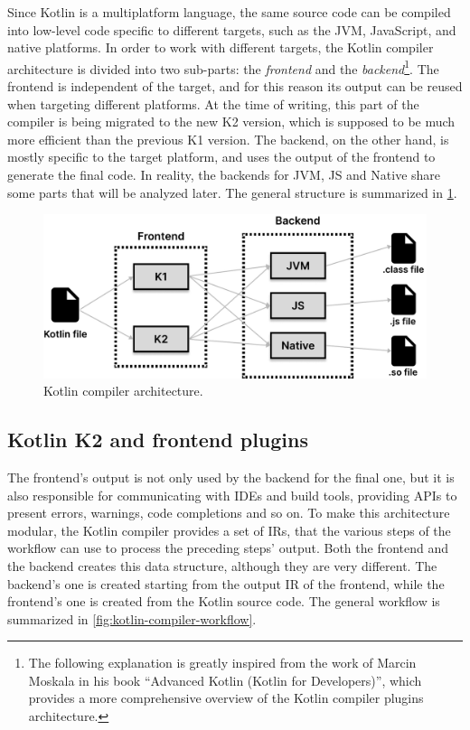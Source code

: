 \documentclass[12pt,a4paper,openright,twoside]{book}
\begin{document}
Since Kotlin is a multiplatform language, the same source code can be compiled
into low-level code specific to different targets, such as the JVM, JavaScript,
and native platforms. In order to work with different targets, the Kotlin
compiler architecture is divided into two sub-parts: the \emph{frontend} and the
\emph{backend}\footnote{The following explanation is greatly inspired from the
work of Marcin Moskala in his book ``Advanced Kotlin (Kotlin for Developers)'',
which provides a more comprehensive overview of the Kotlin compiler plugins
architecture.}.
%
The frontend is independent of the target, and for this reason its output can be
reused when targeting different platforms. At the time of writing, this part of
the compiler is being migrated to the new K2 version, which is supposed to be
much more efficient than the previous K1 version.
%
The backend, on the other hand, is mostly specific to the target platform, and
uses the output of the frontend to generate the final code. In reality, the
backends for JVM, JS and Native share some parts that will be analyzed
later. The general structure is summarized in
\cref{fig:kotlin-compiler-architecture}.

\begin{figure}
  \centering
  \includegraphics[width=.8\linewidth]{figures/kotlin-compiler-architecture.pdf}
  \caption{Kotlin compiler architecture.}
  \label{fig:kotlin-compiler-architecture}
\end{figure}

\subsection{Kotlin K2 and frontend plugins}

The frontend's output is not only used by the backend for the final one, but it
is also responsible for communicating with \acp{IDE} and build tools, providing
APIs to present errors, warnings, code completions and so on. 
%
To make this architecture modular, the Kotlin compiler provides a set of 
\acp{IR}, that the various steps of the workflow
can use to process the preceding steps' output. Both the frontend and the
backend creates this data structure, although they are very different. The 
backend's one is created starting from the output \ac{IR} of the frontend,
while the frontend's one is created from the Kotlin source code. 
The general workflow is summarized in \cref{fig:kotlin-compiler-workflow}.
\end{document}
